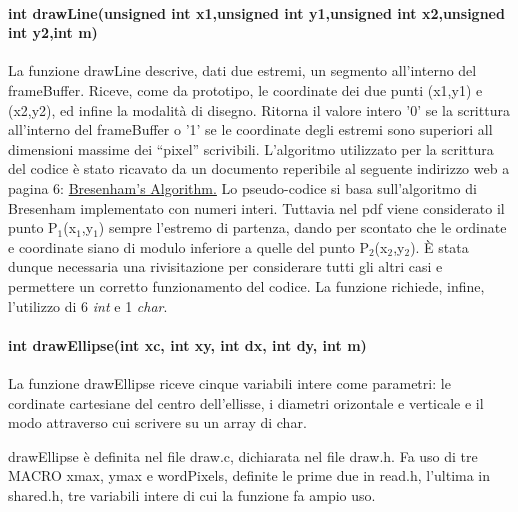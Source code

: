 \documentclass{article}
\begin{document}
		\paragraph{int drawLine(unsigned int x1,unsigned int y1,unsigned int x2,unsigned int y2,int m)}
                La funzione drawLine descrive, dati due estremi, un segmento all'interno del frameBuffer.
                \newline
                Riceve, come da prototipo, le coordinate dei due punti (x1,y1) e (x2,y2), ed infine la modalità di disegno.
                Ritorna il valore intero '0' se la scrittura all'interno del frameBuffer o '1' se le coordinate degli estremi sono superiori all dimensioni massime dei ``pixel'' scrivibili.
                L'algoritmo utilizzato per la scrittura del codice è stato ricavato da un documento reperibile al seguente indirizzo web a pagina 6:
                \href{http://www.idav.ucdavis.edu/education/GraphicsNotes/Bresenhams-Algorithm.pdf}{Bresenham's Algorithm.}\newline
                Lo pseudo-codice si basa sull'algoritmo di Bresenham implementato con numeri interi.
                Tuttavia nel pdf viene considerato il punto P$_{1}$(x$_{1}$,y$_{1}$) sempre l'estremo di partenza, dando per scontato che le ordinate e coordinate siano di modulo inferiore a quelle del punto P$_{2}$(x$_{2}$,y$_{2}$).
                È stata dunque necessaria una rivisitazione per considerare tutti gli altri casi e permettere un corretto funzionamento del codice.
                La funzione richiede, infine, l'utilizzo di 6 \textit{int} e 1 \textit{char}.
		\paragraph{int drawEllipse(int xc, int xy, int dx, int dy, int m)}
		La funzione drawEllipse riceve cinque variabili intere come parametri:
                le cordinate cartesiane del centro dell'ellisse, i diametri orizontale e verticale e il modo attraverso cui scrivere su un array di char.
		
		drawEllipse è definita nel file draw.c, dichiarata nel file draw.h.
                Fa uso di tre MACRO  xmax, ymax e wordPixels, definite le prime due in read.h, l'ultima in shared.h, tre variabili intere di cui la funzione fa ampio uso.
		
\end{document}
